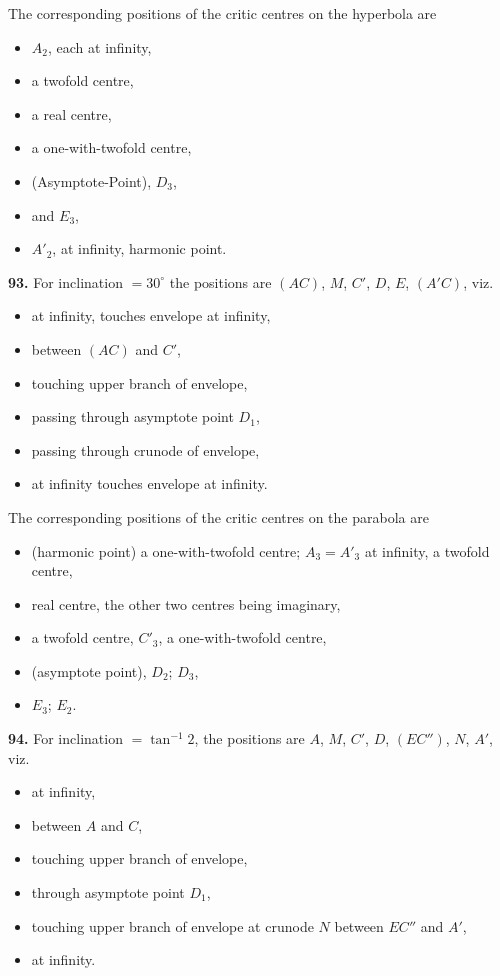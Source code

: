 \documentclass[11pt,a4paper]{article}
\theoremstyle{plain}
\begin{document}
The corresponding positions of the critic centres on the hyperbola are
\begin{itemize}[nosep]
\item[$A_1$,] $A_2$, each at infinity,
\item[$C_2$,] a twofold centre,
\item[$M_2$,] a real centre,
\item[$C'_2$,] a one-with-twofold centre,
\item[$D_2$,] (Asymptote-Point), $D_3$,
\item[$E_2$,] and $E_3$,
\item[$A'_1$,] $A'_2$, at infinity, harmonic point.
\end{itemize}

\noindent\textbf{93.} For inclination $= 30^{\circ}$ the positions are $(AC)$, $M$, $C'$, $D$, $E$, $(A'C)$, viz.
\begin{itemize}[nosep]
\item[$AC$,] at infinity, touches envelope at infinity,
\item[$M$,] between $(AC)$ and $C'$,
\item[$C'$,] touching upper branch of envelope,
\item[$D$,] passing through asymptote point $D_1$,
\item[$E$,] passing through crunode of envelope,
\item[$A'C$,] at infinity touches envelope at infinity.
\end{itemize}
The corresponding positions of the critic centres on the parabola are
\begin{itemize}[nosep]
\item[$A_2$,] (harmonic point) a one-with-twofold centre; $A_3 = A'_3$ at infinity, a twofold centre,
\item[$M_1$,] real centre, the other two centres being imaginary,
\item[$C'_3$,] a twofold centre, $C'_3$, a one-with-twofold centre,
\item[$D_1$,] (asymptote point), $D_2$; $D_3$,
\item[$E_1$,] $E_3$; $E_2$.
\end{itemize}

\noindent\textbf{94.} For inclination $= \tan^{-1}2$, the positions are $A$, $M$, $C'$, $D$, $(EC'')$, $N$, $A'$, viz.
\begin{itemize}[nosep]
\item[$A$,] at infinity,
\item[$M$,] between $A$ and $C$,
\item[$C'$,] touching upper branch of envelope,
\item[$D$,] through asymptote point $D_1$,
\item[$EC''$,] touching upper branch of envelope at crunode $N$ between $EC''$ and $A'$,
\item[$A'$,] at infinity.
\end{itemize}
\end{document}
